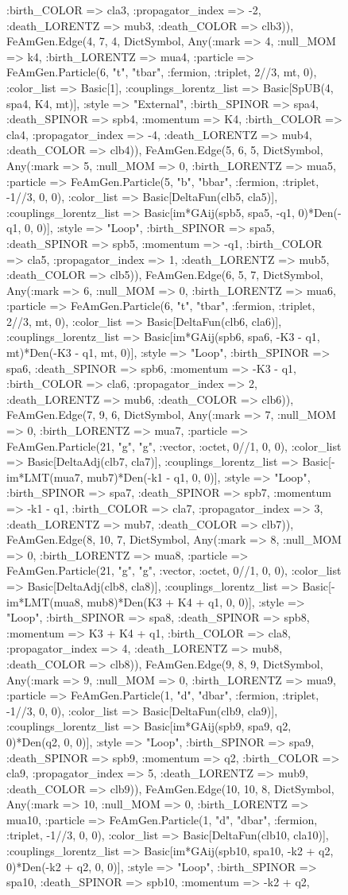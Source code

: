 \documentclass{revtex4}
\begin{document}
\begin{figure}[!htb]
\begin{center}
{:birth_COLOR => cla3, :propagator_index => -2, :death_LORENTZ => mub3, :death_COLOR => clb3)), FeAmGen.Edge(4, 7, 4, Dict{Symbol, Any}(:mark => 4, :null_MOM => k4, :birth_LORENTZ => mua4, :particle => FeAmGen.Particle(6, "t", "tbar", :fermion, :triplet, 2//3, mt, 0), :color_list => Basic[1], :couplings_lorentz_list => Basic[SpUB(4, spa4, K4, mt)], :style => "External", :birth_SPINOR => spa4, :death_SPINOR => spb4, :momentum => K4, :birth_COLOR => cla4, :propagator_index => -4, :death_LORENTZ => mub4, :death_COLOR => clb4)), FeAmGen.Edge(5, 6, 5, Dict{Symbol, Any}(:mark => 5, :null_MOM => 0, :birth_LORENTZ => mua5, :particle => FeAmGen.Particle(5, "b", "bbar", :fermion, :triplet, -1//3, 0, 0), :color_list => Basic[DeltaFun(clb5, cla5)], :couplings_lorentz_list => Basic[im*GAij(spb5, spa5, -q1, 0)*Den(-q1, 0, 0)], :style => "Loop", :birth_SPINOR => spa5, :death_SPINOR => spb5, :momentum => -q1, :birth_COLOR => cla5, :propagator_index => 1, :death_LORENTZ => mub5, :death_COLOR => clb5)), FeAmGen.Edge(6, 5, 7, Dict{Symbol, Any}(:mark => 6, :null_MOM => 0, :birth_LORENTZ => mua6, :particle => FeAmGen.Particle(6, "t", "tbar", :fermion, :triplet, 2//3, mt, 0), :color_list => Basic[DeltaFun(clb6, cla6)], :couplings_lorentz_list => Basic[im*GAij(spb6, spa6, -K3 - q1, mt)*Den(-K3 - q1, mt, 0)], :style => "Loop", :birth_SPINOR => spa6, :death_SPINOR => spb6, :momentum => -K3 - q1, :birth_COLOR => cla6, :propagator_index => 2, :death_LORENTZ => mub6, :death_COLOR => clb6)), FeAmGen.Edge(7, 9, 6, Dict{Symbol, Any}(:mark => 7, :null_MOM => 0, :birth_LORENTZ => mua7, :particle => FeAmGen.Particle(21, "g", "g", :vector, :octet, 0//1, 0, 0), :color_list => Basic[DeltaAdj(clb7, cla7)], :couplings_lorentz_list => Basic[-im*LMT(mua7, mub7)*Den(-k1 - q1, 0, 0)], :style => "Loop", :birth_SPINOR => spa7, :death_SPINOR => spb7, :momentum => -k1 - q1, :birth_COLOR => cla7, :propagator_index => 3, :death_LORENTZ => mub7, :death_COLOR => clb7)), FeAmGen.Edge(8, 10, 7, Dict{Symbol, Any}(:mark => 8, :null_MOM => 0, :birth_LORENTZ => mua8, :particle => FeAmGen.Particle(21, "g", "g", :vector, :octet, 0//1, 0, 0), :color_list => Basic[DeltaAdj(clb8, cla8)], :couplings_lorentz_list => Basic[-im*LMT(mua8, mub8)*Den(K3 + K4 + q1, 0, 0)], :style => "Loop", :birth_SPINOR => spa8, :death_SPINOR => spb8, :momentum => K3 + K4 + q1, :birth_COLOR => cla8, :propagator_index => 4, :death_LORENTZ => mub8, :death_COLOR => clb8)), FeAmGen.Edge(9, 8, 9, Dict{Symbol, Any}(:mark => 9, :null_MOM => 0, :birth_LORENTZ => mua9, :particle => FeAmGen.Particle(1, "d", "dbar", :fermion, :triplet, -1//3, 0, 0), :color_list => Basic[DeltaFun(clb9, cla9)], :couplings_lorentz_list => Basic[im*GAij(spb9, spa9, q2, 0)*Den(q2, 0, 0)], :style => "Loop", :birth_SPINOR => spa9, :death_SPINOR => spb9, :momentum => q2, :birth_COLOR => cla9, :propagator_index => 5, :death_LORENTZ => mub9, :death_COLOR => clb9)), FeAmGen.Edge(10, 10, 8, Dict{Symbol, Any}(:mark => 10, :null_MOM => 0, :birth_LORENTZ => mua10, :particle => FeAmGen.Particle(1, "d", "dbar", :fermion, :triplet, -1//3, 0, 0), :color_list => Basic[DeltaFun(clb10, cla10)], :couplings_lorentz_list => Basic[im*GAij(spb10, spa10, -k2 + q2, 0)*Den(-k2 + q2, 0, 0)], :style => "Loop", :birth_SPINOR => spa10, :death_SPINOR => spb10, :momentum => -k2 + q2, }
\end{center}
\end{figure}
\end{document}
